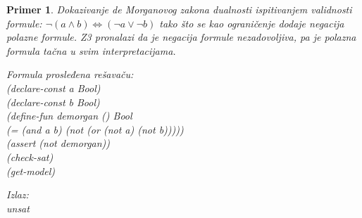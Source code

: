 \documentclass[12pt,oneside]{memoir}
\newtheorem{primer}{Primer}
\begin{document}
\begin{primer} Dokazivanje de Morganovog zakona dualnosti ispitivanjem validnosti formule: $\neg{(a \land b)} \Leftrightarrow (\neg{a} \lor \neg{b}) $ tako što se kao ograničenje dodaje negacija polazne formule. Z3 pronalazi da je negacija formule nezadovoljiva, pa je polazna formula tačna u svim interpretacijama. \\

\hspace{-0.7cm}
\begin{minipage}[b]{0.4\textwidth}
Formula prosleđena rešavaču:
\\(declare-const a Bool)
\\(declare-const b Bool)
\\(define-fun demorgan () Bool
\\    (= (and a b) (not (or (not a) (not b)))))
\\(assert (not demorgan))
\\(check-sat) 
\\(get-model)
\end{minipage}
\hspace{3.5cm}
\begin{minipage}[t]{0.4\textwidth}
\vspace{-5.35cm}
Izlaz:
\\unsat
\end{minipage}
\end{primer}
 

\end{document}
